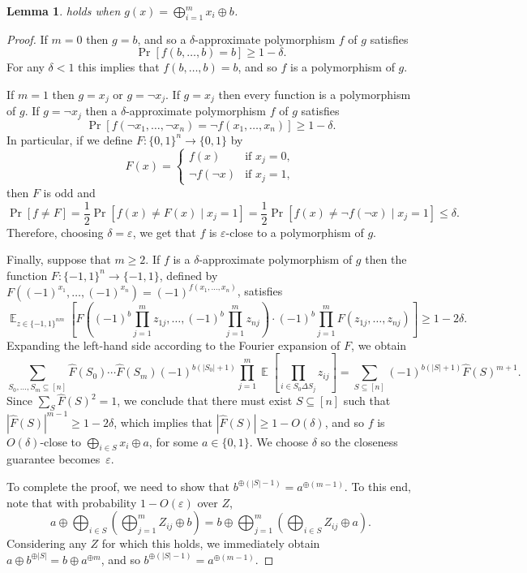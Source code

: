 \documentclass{article}
\newtheorem{lemma}[theorem]{Lemma}
\theoremstyle{definition}
\theoremstyle{remark}
\DeclareMathOperator*{\E}{\mathbb{E}}
\newcommand\eps{\varepsilon}
\renewcommand\epsilon{\eps}
\renewcommand\geq{\geqslant}
\renewcommand\leq{\leqslant}
\begin{document}
\begin{lemma} \label{lem:approximate-polymorphism-xor}
 holds when $g(x) = \bigoplus_{i=1}^m x_i \oplus b$.
\end{lemma}
\begin{proof}
If $m = 0$ then $g = b$, and so a $\delta$-approximate polymorphism $f$ of $g$ satisfies
\[
 \Pr[f(b,\ldots,b) = b] \geq 1-\delta.
\]
For any $\delta < 1$ this implies that $f(b,\ldots,b) = b$, and so $f$ is a polymorphism of $g$.

If $m = 1$ then $g = x_j$ or $g = \lnot x_j$. If $g = x_j$ then every function is a polymorphism of $g$. If $g = \lnot x_j$ then a $\delta$-approximate polymorphism $f$ of $g$ satisfies
\[
 \Pr[f(\lnot x_1,\ldots,\lnot x_n) = \lnot f(x_1,\ldots,x_n)] \geq 1-\delta.
\]
In particular, if we define $F\colon \{0,1\}^n \to \{0,1\}$ by
\[
 F(x) =
 \begin{cases}
 f(x) & \text{if } x_j = 0, \\
 \lnot f(\lnot x) & \text{if } x_j = 1,
 \end{cases}
\]
then $F$ is odd and
\[
 \Pr[f \neq F] =
 \frac{1}{2} \Pr[f(x) \neq F(x) \mid x_j = 1] =
 \frac{1}{2} \Pr[f(x) \neq \lnot f(\lnot x) \mid x_j = 1] \leq \delta.
\]
Therefore, choosing $\delta = \epsilon$, we get that $f$ is $\epsilon$-close to a polymorphism of $g$.

Finally, suppose that $m \geq 2$. If $f$ is a $\delta$-approximate polymorphism of $g$ then the function $F\colon \{-1,1\}^n \to \{-1,1\}$, defined by $F((-1)^{x_1},\ldots,(-1)^{x_n}) = (-1)^{f(x_1,\ldots,x_n)}$, satisfies
\[
 \E_{z \in \{-1,1\}^{nm}}\left[
 F\left((-1)^b \prod_{j=1}^m z_{1j}, \ldots, (-1)^b \prod_{j=1}^m z_{nj}\right) \cdot
 (-1)^b \prod_{j=1}^m F(z_{1j},\ldots,z_{nj})
 \right] \geq 1 - 2\delta.
\]
Expanding the left-hand side according to the Fourier expansion of $F$, we obtain
\[
 \sum_{S_0,\ldots,S_m \subseteq [n]} \hat{F}(S_0) \cdots \hat{F}(S_m) (-1)^{b(|S_0|+1)}
 \prod_{j=1}^m 
 \E\left[\prod_{i \in S_0 \Delta S_j} z_{ij} \right] =
 \sum_{S \subseteq [n]} (-1)^{b(|S|+1)} \hat{F}(S)^{m+1}.
\]
Since $\sum_S \hat{F}(S)^2 = 1$, we conclude that there must exist $S \subseteq [n]$ such that $|\hat{F}(S)|^{m-1} \geq 1 - 2\delta$, which implies that $|\hat{F}(S)| \geq 1 - O(\delta)$, and so $f$ is $O(\delta)$-close to $\bigoplus_{i \in S} x_i \oplus a$, for some $a \in \{0,1\}$. We choose $\delta$ so the closeness guarantee becomes~$\epsilon$.

To complete the proof, we need to show that $b^{\oplus (|S|-1)} = a^{\oplus (m-1)}$. To this end, note that with probability $1-O(\epsilon)$ over $Z$,
\[
 a \oplus \bigoplus_{i \in S} \left( \bigoplus_{j=1}^m Z_{ij} \oplus b\right) =
 b \oplus \bigoplus_{j=1}^m \left( \bigoplus_{i \in S} Z_{ij} \oplus a \right).
\]
Considering any $Z$ for which this holds, we immediately obtain $a \oplus b^{\oplus |S|} = b \oplus a^{\oplus m}$, and so $b^{\oplus (|S|-1)} = a^{\oplus (m-1)}$.
\end{proof}
\end{document}
